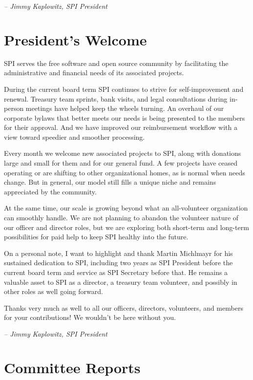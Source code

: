 \documentclass[a4paper]{report}
\begin{document}
  \emph{-- Jimmy Kaplowitz, SPI President}

\newpage

\tableofcontents

\newpage

\chapter{President's Welcome}
\label{sec:president}

SPI serves the free software and open source community by facilitating the
administrative and financial needs of its associated projects.

During the current board term SPI continues to strive for self-improvement and
renewal. Treasury team sprints, bank visits, and legal consultations during
in-person meetings have helped keep the wheels turning. An overhaul of our
corporate bylaws that better meets our needs is being presented to the members
for their approval. And we have improved our reimbursement workflow with a
view toward speedier and smoother processing.

Every month we welcome new associated projects to SPI, along with donations
large and small for them and for our general fund. A few projects have ceased
operating or are shifting to other organizational homes, as is normal when
needs change. But in general, our model still fills a unique niche and remains
appreciated by the community.

At the same time, our scale is growing beyond what an all-volunteer
organization can smoothly handle. We are not planning to abandon the volunteer
nature of our officer and director roles, but we are exploring both short-term
and long-term possibilities for paid help to keep SPI healthy into the future.

On a personal note, I want to highlight and thank Martin Michlmayr for his
sustained dedication to SPI, including two years as SPI President before the
current board term and service as SPI Secretary before that. He remains a
valuable asset to SPI as a director, a treasury team volunteer, and possibly
in other roles as well going forward.

Thanks very much as well to all our officers, directors, volunteers, and
members for your contributions! We wouldn't be here without you.

  \emph{-- Jimmy Kaplowitz, SPI President}

\chapter{Committee Reports}
\end{document}
